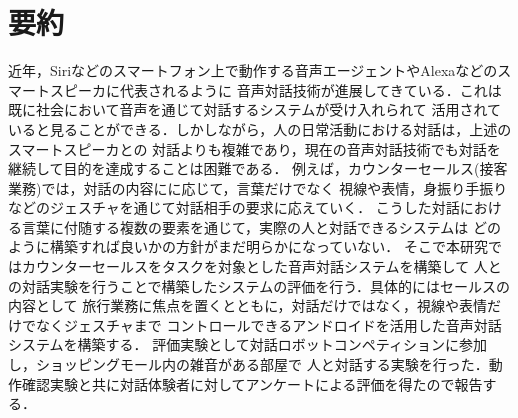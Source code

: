 \thispagestyle{empty}
\section*{要約}
近年，Siriなどのスマートフォン上で動作する音声エージェントやAlexaなどのスマートスピーカに代表されるように
音声対話技術が進展してきている．これは既に社会において音声を通じて対話するシステムが受け入れられて
活用されていると見ることができる．しかしながら，人の日常活動における対話は，上述のスマートスピーカとの
対話よりも複雑であり，現在の音声対話技術でも対話を継続して目的を達成することは困難である．
例えば，カウンターセールス(接客業務)では，対話の内容にに応じて，言葉だけでなく
視線や表情，身振り手振りなどのジェスチャを通じて対話相手の要求に応えていく．
こうした対話における言葉に付随する複数の要素を通じて，実際の人と対話できるシステムは
どのように構築すれば良いかの方針がまだ明らかになっていない．
そこで本研究ではカウンターセールスをタスクを対象とした音声対話システムを構築して
人との対話実験を行うことで構築したシステムの評価を行う．具体的にはセールスの内容として
旅行業務に焦点を置くとともに，対話だけではなく，視線や表情だけでなくジェスチャまで
コントロールできるアンドロイドを活用した音声対話システムを構築する．
評価実験として対話ロボットコンペティションに参加し，ショッピングモール内の雑音がある部屋で
人と対話する実験を行った．動作確認実験と共に対話体験者に対してアンケートによる評価を得たので報告する．

